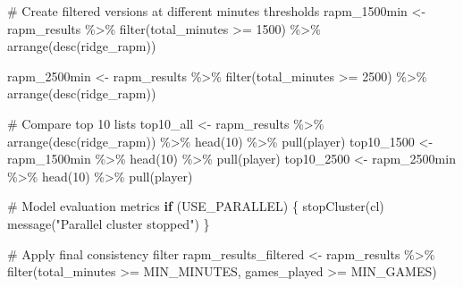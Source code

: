 \documentclass[
  letterpaper,
  DIV=11,
  numbers=noendperiod]{scrartcl}
\newenvironment{Shaded}{\begin{snugshade}}{\end{snugshade}}
\newcommand{\CommentTok}[1]{\textcolor[rgb]{0.37,0.37,0.37}{#1}}
\newcommand{\ControlFlowTok}[1]{\textcolor[rgb]{0.00,0.23,0.31}{\textbf{#1}}}
\newcommand{\DecValTok}[1]{\textcolor[rgb]{0.68,0.00,0.00}{#1}}
\newcommand{\FunctionTok}[1]{\textcolor[rgb]{0.28,0.35,0.67}{#1}}
\newcommand{\NormalTok}[1]{\textcolor[rgb]{0.00,0.23,0.31}{#1}}
\newcommand{\OtherTok}[1]{\textcolor[rgb]{0.00,0.23,0.31}{#1}}
\newcommand{\SpecialCharTok}[1]{\textcolor[rgb]{0.37,0.37,0.37}{#1}}
\newcommand{\StringTok}[1]{\textcolor[rgb]{0.13,0.47,0.30}{#1}}
\begin{document}
\begin{Shaded}
\begin{Highlighting}[]
\CommentTok{\# Create filtered versions at different minutes thresholds}
\NormalTok{rapm\_1500min }\OtherTok{\textless{}{-}}\NormalTok{ rapm\_results }\SpecialCharTok{\%\textgreater{}\%}
  \FunctionTok{filter}\NormalTok{(total\_minutes }\SpecialCharTok{\textgreater{}=} \DecValTok{1500}\NormalTok{) }\SpecialCharTok{\%\textgreater{}\%}
  \FunctionTok{arrange}\NormalTok{(}\FunctionTok{desc}\NormalTok{(ridge\_rapm))}

\NormalTok{rapm\_2500min }\OtherTok{\textless{}{-}}\NormalTok{ rapm\_results }\SpecialCharTok{\%\textgreater{}\%}
  \FunctionTok{filter}\NormalTok{(total\_minutes }\SpecialCharTok{\textgreater{}=} \DecValTok{2500}\NormalTok{) }\SpecialCharTok{\%\textgreater{}\%}
  \FunctionTok{arrange}\NormalTok{(}\FunctionTok{desc}\NormalTok{(ridge\_rapm))}

\CommentTok{\# Compare top 10 lists}
\NormalTok{top10\_all }\OtherTok{\textless{}{-}}\NormalTok{ rapm\_results }\SpecialCharTok{\%\textgreater{}\%}
  \FunctionTok{arrange}\NormalTok{(}\FunctionTok{desc}\NormalTok{(ridge\_rapm)) }\SpecialCharTok{\%\textgreater{}\%}
  \FunctionTok{head}\NormalTok{(}\DecValTok{10}\NormalTok{) }\SpecialCharTok{\%\textgreater{}\%}
  \FunctionTok{pull}\NormalTok{(player)}
\NormalTok{top10\_1500 }\OtherTok{\textless{}{-}}\NormalTok{ rapm\_1500min }\SpecialCharTok{\%\textgreater{}\%}
  \FunctionTok{head}\NormalTok{(}\DecValTok{10}\NormalTok{) }\SpecialCharTok{\%\textgreater{}\%}
  \FunctionTok{pull}\NormalTok{(player)}
\NormalTok{top10\_2500 }\OtherTok{\textless{}{-}}\NormalTok{ rapm\_2500min }\SpecialCharTok{\%\textgreater{}\%}
  \FunctionTok{head}\NormalTok{(}\DecValTok{10}\NormalTok{) }\SpecialCharTok{\%\textgreater{}\%}
  \FunctionTok{pull}\NormalTok{(player)}


\CommentTok{\# Model evaluation metrics}
\ControlFlowTok{if}\NormalTok{ (USE\_PARALLEL) \{}
  \FunctionTok{stopCluster}\NormalTok{(cl)}
  \FunctionTok{message}\NormalTok{(}\StringTok{"Parallel cluster stopped"}\NormalTok{)}
\NormalTok{\}}


\CommentTok{\# Apply final consistency filter }
\NormalTok{rapm\_results\_filtered }\OtherTok{\textless{}{-}}\NormalTok{ rapm\_results }\SpecialCharTok{\%\textgreater{}\%}
  \FunctionTok{filter}\NormalTok{(total\_minutes }\SpecialCharTok{\textgreater{}=}\NormalTok{ MIN\_MINUTES, games\_played }\SpecialCharTok{\textgreater{}=}\NormalTok{ MIN\_GAMES)}


\end{Highlighting}
\end{Shaded}
\end{document}
